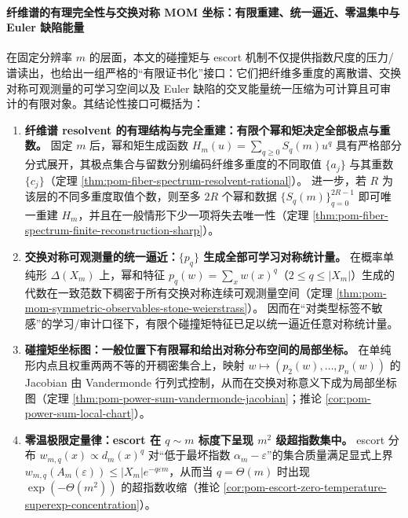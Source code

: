 \paragraph{纤维谱的有理完全性与交换对称 MOM 坐标：有限重建、统一逼近、零温集中与 Euler 缺陷能量}
在固定分辨率 \(m\) 的层面，本文的碰撞矩与 escort 机制不仅提供指数尺度的压力/谱读出，也给出一组严格的“有限证书化”接口：它们把纤维多重度的离散谱、交换对称可观测量的可学习空间以及 Euler 缺陷的交叉能量统一压缩为可计算且可审计的有限对象。其结论性接口可概括为：
\begin{enumerate}
  \item \textbf{纤维谱 resolvent 的有理结构与完全重建：有限个幂和矩决定全部极点与重数。}
  固定 \(m\) 后，幂和矩生成函数 \(H_m(u)=\sum_{q\ge 0}S_q(m)u^q\) 具有严格部分分式展开，其极点集合与留数分别编码纤维多重度的不同取值 \(\{a_j\}\) 与其重数 \(\{c_j\}\)（定理 \ref{thm:pom-fiber-spectrum-resolvent-rational}）。
  进一步，若 \(R\) 为该层的不同多重度取值个数，则至多 \(2R\) 个幂和数据 \(\{S_q(m)\}_{q=0}^{2R-1}\) 即可唯一重建 \(H_m\)，并且在一般情形下少一项将失去唯一性（定理 \ref{thm:pom-fiber-spectrum-finite-reconstruction-sharp}）。

  \item \textbf{交换对称可观测量的统一逼近：\texorpdfstring{$\{p_q\}$}{pq} 生成全部可学习对称统计量。}
  在概率单纯形 \(\Delta(X_m)\) 上，幂和特征 \(p_q(w)=\sum_x w(x)^q\)（\(2\le q\le |X_m|\)）生成的代数在一致范数下稠密于所有交换对称连续可观测量空间（定理 \ref{thm:pom-mom-symmetric-observables-stone-weierstrass}）。
  因而在“对类型标签不敏感”的学习/审计口径下，有限个碰撞矩特征已足以统一逼近任意对称统计量。

  \item \textbf{碰撞矩坐标图：一般位置下有限幂和给出对称分布空间的局部坐标。}
  在单纯形内点且权重两两不等的开稠密集合上，映射 \(w\mapsto(p_2(w),\dots,p_n(w))\) 的 Jacobian 由 Vandermonde 行列式控制，从而在交换对称意义下成为局部坐标图（定理 \ref{thm:pom-power-sum-vandermonde-jacobian}；推论 \ref{cor:pom-power-sum-local-chart}）。

  \item \textbf{零温极限定量律：escort 在 \texorpdfstring{$q\sim m$}{q~m} 标度下呈现 \texorpdfstring{$m^2$}{m^2} 级超指数集中。}
  escort 分布 \(w_{m,q}(x)\propto d_m(x)^q\) 对“低于最坏指数 \(\alpha_m-\varepsilon\)”的集合质量满足显式上界 \(w_{m,q}(A_m(\varepsilon))\le |X_m|e^{-q\varepsilon m}\)，从而当 \(q=\Theta(m)\) 时出现 \(\exp(-\Theta(m^2))\) 的超指数收缩（推论 \ref{cor:pom-escort-zero-temperature-superexp-concentration}）。


\end{enumerate}
